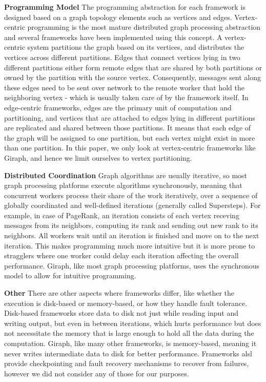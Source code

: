 \textbf{Programming Model}
The programming abstraction for each framework is designed based on a graph topology 
elements such as vertices and edges. Vertex-centric programming is the most mature distributed 
graph processing abstraction and several frameworks have been implemented using this concept.
A vertex-centric system partitions the graph based on its vertices, and distributes the 
vertices across different partitions. Edges that connect vertices lying in two different 
partitions either form remote edges that are shared by both partitions or owned by the partition 
with the source vertex. Consequently, messages sent along these edges need to be sent over 
network to the remote worker that hold the neighboring vertex - which is usually taken care of 
by the framework itself. In edge-centric frameworks, edges are the primary unit of computation 
and partitioning, and vertices that are attached to edges lying in 
different partitions are replicated and shared between those partitions. It means that each 
edge of the graph will be assigned to one partition, but each vertex might exist in more 
than one partition. In this paper, we only look at vertex-centric frameworks like Giraph,
and hence we limit ourselves to vertex partitioning.

\textbf{Distributed Coordination}
Graph algorithms are usually iterative, so most graph processing platforms execute 
algorithms synchronously, meaning that concurrent workers process their share of the work 
iteratively, over a sequence of globally coordinated and well-defined iterations (generally called 
Supersteps). For example, in case of PageRank, an iteration consists of each vertex receving messages
from its neighbors, computing its rank and sending out new rank to its neighbors. All workers 
wait until an iteration is finished and move on to the next iteration. This makes programming 
much more intuitive but it is more prone to stragglers where one worker could delay each iteration
affecting the overall performance. Giraph, like most graph processing platforms, uses 
the synchronous model to allow for intuitive programming. 

\textbf{Other} 
There are other aspects where frameworks differ, like whether the execution is disk-based or 
memory-based, or how they handle fault tolerance. Disk-based frameworks store data to disk not 
just while reading input and writing output, but even in between iterations, which hurts 
performance but does not necessitate the memory that is large enough to hold all the data 
during the computation. Giraph, like many other frameworks, is memory-based, meaning it never
writes intermediate data to disk for better performance. Frameworks alsl provide checkpointing
and fault recovery mechanisms to recover from failures, however we did not consider any of those 
for our purposes.













